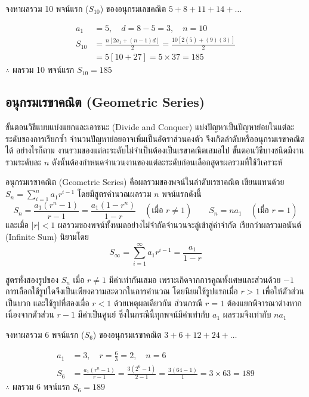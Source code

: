 \begin{ex}
\label{ex:arithmetic-series-sum}
จงหาผลรวม 10 พจน์แรก ($S_{10}$) ของอนุกรมเลขคณิต $5 + 8 + 11 + 14 + \dots$
\end{ex}
\begin{solution}
\begin{align*}
a_1 &= 5, \quad d = 8 - 5 = 3, \quad n = 10\\
S_{10} &= \frac{n[2a_1 + (n-1)d]}{2} = \frac{10[2(5) + (9)(3)]}{2}\\
&= 5[10 + 27] = 5 \times 37 = 185
\end{align*}
$\therefore$ ผลรวม 10 พจน์แรก $S_{10} = 185$ \solhere
\end{solution}

\subsection{อนุกรมเรขาคณิต (Geometric Series)}
\label{sec:geometric-series}
ขั้นตอนวิธีแบบแบ่งแยกและเอาชนะ (Divide and Conquer) แบ่งปัญหาเป็นปัญหาย่อยในแต่ละระดับของการเรียกซ้ำ จำนวนปัญหาย่อยอาจเพิ่มเป็นอัตราส่วนคงตัว จึงเกิดลำดับหรืออนุกรมเรขาคณิตได้ อย่างไรก็ตาม งานรวมของแต่ละระดับไม่จำเป็นต้องเป็นเรขาคณิตเสมอไป ขั้นตอนวิธีบางชนิดมีงานรวมระดับละ $n$ ดังนั้นต้องกำหนดจำนวนงานของแต่ละระดับก่อนเลือกสูตรผลรวมที่ใช้วิเคราะห์~\parencite{grimaldi2004discrete}

\begin{definition}[อนุกรมเรขาคณิต]
อนุกรมเรขาคณิต (Geometric Series) คือผลรวมของพจน์ในลำดับเรขาคณิต เขียนแทนด้วย $S_n = \sum_{i=1}^{n} a_1 r^{i-1}$ โดยมีสูตรคำนวณผลรวม $n$ พจน์แรกดังนี้
\[ S_n = \frac{a_1(r^n - 1)}{r - 1} = \frac{a_1(1 - r^n)}{1 - r} \quad (\text{เมื่อ } r \neq 1) \qquad S_n = n a_1 \quad (\text{เมื่อ } r = 1) \]
และเมื่อ $\lvert r \rvert < 1$ ผลรวมของพจน์ทั้งหมดอย่างไม่จำกัดจำนวนจะลู่เข้าสู่ค่าจำกัด เรียกว่าผลรวมอนันต์ (Infinite Sum) นิยามโดย
\[ S_\infty = \sum_{i=1}^{\infty} a_1 r^{i-1} = \frac{a_1}{1 - r} \]
\end{definition}

สูตรทั้งสองรูปของ $S_n$ เมื่อ $r \neq 1$ มีค่าเท่ากันเสมอ เพราะเกิดจากการคูณทั้งเศษและส่วนด้วย $-1$ การเลือกใช้รูปใดจึงเป็นเพียงความสะดวกในการคำนวณ โดยนิยมใช้รูปแรกเมื่อ $r > 1$ เพื่อให้ตัวส่วนเป็นบวก และใช้รูปที่สองเมื่อ $r < 1$ ด้วยเหตุผลเดียวกัน ส่วนกรณี $r = 1$ ต้องแยกพิจารณาต่างหาก เนื่องจากตัวส่วน $r - 1$ มีค่าเป็นศูนย์ ซึ่งในกรณีนี้ทุกพจน์มีค่าเท่ากับ $a_1$ ผลรวมจึงเท่ากับ $n a_1$

\begin{ex}
\label{ex:geom-series-sum}
จงหาผลรวม 6 พจน์แรก ($S_6$) ของอนุกรมเรขาคณิต $3 + 6 + 12 + 24 + \dots$
\end{ex}
\begin{solution}
\begin{align*}
a_1 &= 3, \quad r = \frac{6}{3} = 2, \quad n = 6\\
S_6 &= \frac{a_1(r^n - 1)}{r - 1} = \frac{3(2^6 - 1)}{2 - 1} = \frac{3(64-1)}{1} = 3 \times 63 = 189
\end{align*}
$\therefore$ ผลรวม 6 พจน์แรก $S_6 = 189$ \solhere
\end{solution}

